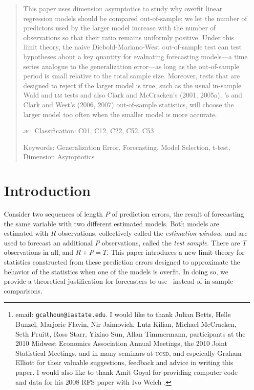 \documentclass[11pt]{article}
\author{Gray Calhoun\thanks{email: \texttt{gcalhoun@iastate.edu}. I
    would like to thank Julian Betts, Helle Bunzel, Marjorie Flavin,
    Nir Jaimovich, Lutz Kilian, Michael McCracken, Seth Pruitt, Ross
    Starr, Yixiao Sun, Allan Timmermann, participants at the 2010
    Midwest Economics Association Annual Meetings, the 2010 Joint
    Statistical Meetings, and in many seminars at \textsc{ucsd}, and
    espeically Graham Elliott for their valuable suggestions, feedback
    and advice in writing this paper.  I would also like to thank Amit
    Goyal for providing computer code and data for his 2008 RFS paper
    with Ivo Welch \citep{GoW:08}.} \\ Iowa State University,
  Economics Department}
\date{October 24, 2011}
\newcommand{\citepos}[1]{\citeauthor{#1}'s \citeyearpar{#1}}
\begin{document}
\maketitle

\begin{abstract}\thispagestyle{empty}\noindent
  This paper uses dimension asymptotics to study why overfit linear
  regression models should be compared out-of-sample; we let the
  number of predictors used by the larger model increase with the
  number of observations so that their ratio remains uniformly
  positive.  Under this limit theory, the naive Diebold-Mariano-West
  out-of-sample test can test hypotheses about a key quantity for
  evaluating forecasting models---a time series analogue to the
  generalization error---as long as the out-of-sample period is small
  relative to the total sample size.  Moreover, tests that are
  designed to reject if the larger model is true, such as the usual
  in-sample Wald and \textsc{lm} tests and also Clark and McCracken's
  (2001, 2005a), \citepos{Mcc:07} and Clark and West's (2006, 2007)
  out-of-sample statistics, will choose the larger model too often
  when the smaller model is more accurate.

\noindent \textsc{jel} Classification: C01, C12, C22, C52, C53

\noindent Keywords: Generalization Error, Forecasting, Model
Selection, t-test, Dimension Asymptotics
\end{abstract}

\section{Introduction}\label{sec:introduction}
Consider two sequences of length $P$ of prediction errors, the result
of forecasting the same variable with two different estimated models.
Both models are estimated with $R$ observations, collectively called
the {\em estimation window}, and are used to forecast an additional
$P$ observations, called the {\em test sample}.  There are $T$
observations in all, and $R+P=T$.  This paper introduces a new limit
theory for statistics constructed from these prediction errors
designed to approximate the behavior of the statistics when one of the
models is overfit.  In doing so, we provide a theoretical
justification for forecasters to use \oos\ instead of
in-sample comparisons.
\end{document}
